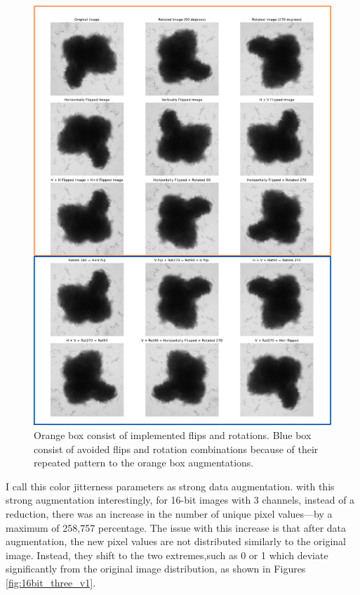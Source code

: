 \begin{figure}[H]
  \centering
  \includegraphics[scale=0.35]{figures/repeat.png} 
  \caption{Orange box consist of implemented flips and rotations. Blue box consist of avoided flips and rotation combinations because of their repeated pattern to
   the orange box augmentations.}
  \label{fig:repeat}
\end{figure}

I call this color jitterness parameters as strong data augmentation. with this strong augmentation interestingly, for 16-bit images with 3 channels, instead of a reduction, there was an 
increase in the number of unique pixel values—by a maximum of 258,757 percentage. The issue with this increase is that after data augmentation, the new pixel
 values are not distributed similarly to the original image. Instead, they shift to
 the two extremes,such as 0 or 1 which deviate significantly from the original image distribution, as shown in 
 Figures \ref{fig:16bit_three_v1}.

